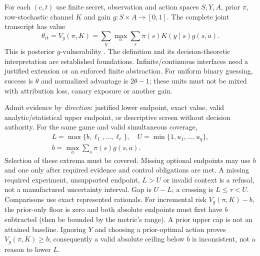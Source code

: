 For each $(c,t)$ use finite secret, observation and action spaces $S,Y,A$,
prior $\pi$, row-stochastic channel $K$ and gain $g:S\times A\to[0,1]$.
The complete joint transcript has value
\[
 \theta_{ct}=V_g(\pi,K)
   =\sum_y\max_a\sum_s\pi(s)K(y\mid s)g(s,a).
\]
This is posterior $g$-vulnerability \citep{alvim2012gain}. The definition and
its decision-theoretic interpretation are established foundations.
Infinite/continuous interfaces need a justified extension or an enforced
finite abstraction. For uniform binary guessing, success is $\theta$ and
normalized advantage is $2\theta-1$; these units must not be mixed with
attribution loss, canary exposure or another gain.

Admit evidence by \emph{direction}: justified lower endpoint, exact value,
valid analytic/statistical upper endpoint, or descriptive screen without
decision authority. For the same game and valid simultaneous coverage,
\[
 \begin{gathered}
 L=\max\{b,\ell_1,\ldots,\ell_r\},\quad U=\min\{1,u_1,\ldots,u_q\},\\
 b=\max_a\sum_s\pi(s)g(s,a).
 \end{gathered}
\]
Selection of these extrema must be covered. Missing optional endpoints may
use $b$ and one only after required evidence and control obligations are met.
A missing required experiment, unsupported endpoint, $L>U$ or invalid context
is a refusal, not a manufactured uncertainty interval. Gap is $U-L$; a
crossing is $L\le\tau<U$. Comparisons use exact represented rationals.
For incremental risk $V_g(\pi,K)-b$, the prior-only floor is zero and both
absolute endpoints must first have $b$ subtracted (then be bounded by the
metric's range). A prior upper cap is not an attained baseline. Ignoring $Y$
and choosing a prior-optimal action proves $V_g(\pi,K)\ge b$; consequently a
valid absolute ceiling below $b$ is inconsistent, not a reason to lower $L$.

